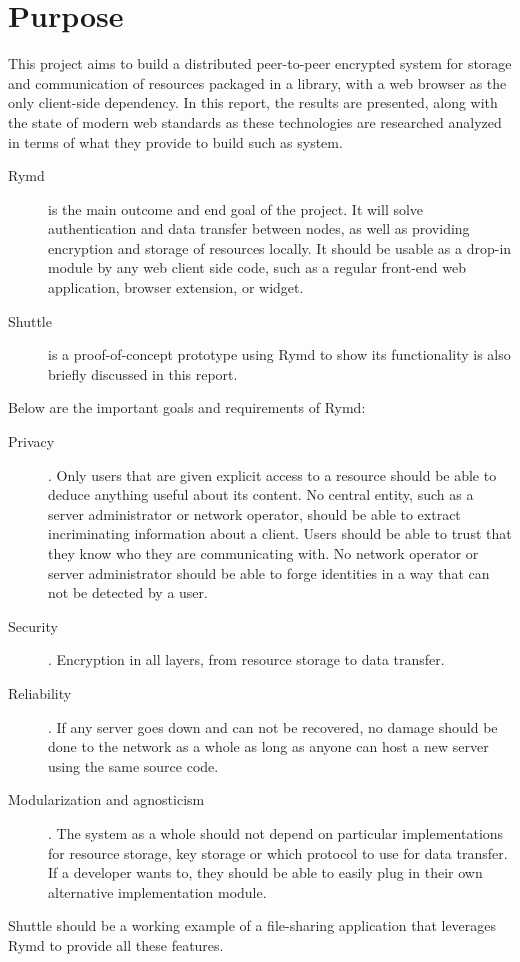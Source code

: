 \section{Purpose}\label{sec:purpose}

This project aims to build a distributed peer-to-peer encrypted system for storage and communication of resources packaged in a library, with a web browser as the only client-side dependency. In this report, the results are presented, along with the state of modern web standards as these technologies are researched analyzed in terms of what they provide to build such as system.

\begin{description}
\item[Rymd] is the main outcome and end goal of the project. It will solve authentication and data transfer between nodes, as well as providing encryption and storage of resources locally. It should be usable as a drop-in module by any web client side code, such as a regular front-end web application, browser extension, or widget.
\item[Shuttle] is a proof-of-concept prototype using Rymd to show its functionality is also briefly discussed in this report.
\end{description}

Below are the important goals and requirements of Rymd:

\begin{description}
  \item[Privacy]. Only users that are given explicit access to a resource should be able to deduce anything useful about its content. No central entity, such as a server administrator or network operator, should be able to extract incriminating information about a client. Users should be able to trust that they know who they are communicating with. No network operator or server administrator should be able to forge identities in a way that can not be detected by a user.

\item[Security]. Encryption in all layers, from resource storage to data transfer.

\item[Reliability]. If any server goes down and can not be recovered, no damage should be done to the network as a whole as long as anyone can host a new server using the same source code.

\item[Modularization and agnosticism]. The system as a whole should not depend on particular implementations for resource storage, key storage or which protocol to use for data transfer. If a developer wants to, they should be able to easily plug in their own alternative implementation module.

\end{description}

Shuttle should be a working example of a file-sharing application that leverages Rymd to provide all these features.

